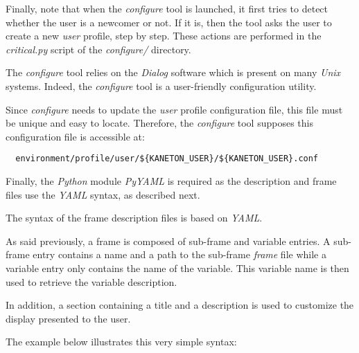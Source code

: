 Finally, note that when the \textit{configure} tool is launched, it first
tries to detect whether the user is a newcomer or not. If it is, then the
tool asks the user to create a new \textit{user} profile, step by step. These
actions are performed in the \textit{critical.py} script of the
\textit{configure/} directory.



The \textit{configure} tool relies on the \textit{Dialog} software which
is present on many \textit{Unix} systems. Indeed, the \textit{configure}
tool is a user-friendly configuration utility.

Since \textit{configure} needs to update the \textit{user} profile
configuration file, this file must be unique and easy to locate. Therefore,
the \textit{configure} tool supposes this configuration file is accessible at:

\begin{verbatim}
  environment/profile/user/${KANETON_USER}/${KANETON_USER}.conf
\end{verbatim}

Finally, the \textit{Python} module \textit{PyYAML} is required as the
description and frame files use the \textit{YAML} syntax, as described next.



The syntax of the frame description files is based on \textit{YAML}.

As said previously, a frame is composed of sub-frame and variable entries. A
sub-frame entry contains a name and a path to the sub-frame \textit{frame}
file while a variable entry only contains the name of the variable. This
variable name is then used to retrieve the variable description.

In addition, a section containing a title and a description is used to
customize the display presented to the user.

The example below illustrates this very simple syntax:

